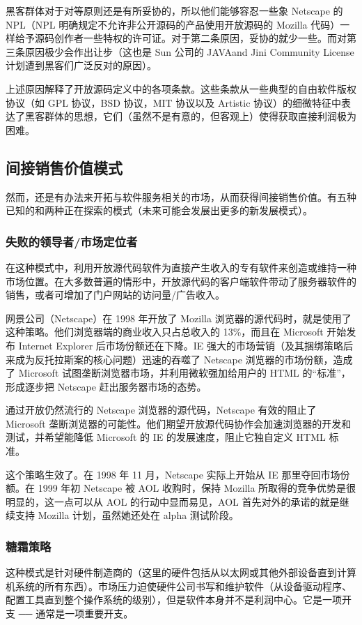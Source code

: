 黑客群体对于对等原则还是有所妥协的，所以他们能够容忍一些象 Netscape 的 NPL（NPL 明确规定不允许非公开源码的产品使用开放源码的 Mozilla 代码）一样给予源码创作者一些特权的许可证。对于第二条原因，妥协的就少一些。而对第三条原因极少会作出让步（这也是 Sun 公司的 JAVAand Jini Community License 计划遭到黑客们广泛反对的原因）。


上述原因解释了开放源码定义中的各项条款。这些条款从一些典型的自由软件版权协议（如 GPL 协议，BSD 协议，MIT 协议以及 Artistic 协议）的细微特征中表达了黑客群体的思想，它们（虽然不是有意的，但客观上）使得获取直接利润极为困难。

\subsection{间接销售价值模式}
然而，还是有办法来开拓与软件服务相关的市场，从而获得间接销售价值。有五种已知的和两种正在探索的模式（未来可能会发展出更多的新发展模式）。

\subsubsection{失败的领导者/市场定位者}
在这种模式中，利用开放源代码软件为直接产生收入的专有软件来创造或维持一种市场位置。在大多数普遍的情形中，开放源代码的客户端软件带动了服务器软件的销售，或者可增加了门户网站的访问量/广告收入。


网景公司（Netscape）在 1998 年开放了 Mozilla 浏览器的源代码时，就是使用了这种策略。他们浏览器端的商业收入只占总收入的 13\%，而且在 Microsoft 开始发布 Internet Explorer 后市场份额还在下降。IE 强大的市场营销（及其捆绑策略后来成为反托拉斯案的核心问题）迅速的吞噬了 Netscape 浏览器的市场份额，造成了 Microsoft 试图垄断浏览器市场，并利用微软强加给用户的 HTML 的“标准”，形成逐步把 Netscape 赶出服务器市场的态势。


通过开放仍然流行的 Netscape 浏览器的源代码，Netscape 有效的阻止了 Microsoft 垄断浏览器的可能性。他们期望开放源代码协作会加速浏览器的开发和测试，并希望能降低 Microsoft 的 IE 的发展速度，阻止它独自定义 HTML 标准。


这个策略生效了。在 1998 年 11 月，Netscape 实际上开始从 IE 那里夺回市场份额。在 1999 年初 Netscape 被 AOL 收购时，保持 Mozilla 所取得的竞争优势是很明显的，这一点可以从 AOL 的行动中显而易见，AOL 首先对外的承诺的就是继续支持 Mozilla 计划，虽然她还处在 alpha 测试阶段。

\subsubsection{糖霜策略}
这种模式是针对硬件制造商的（这里的硬件包括从以太网或其他外部设备直到计算机系统的所有东西）。市场压力迫使硬件公司书写和维护软件（从设备驱动程序、配置工具直到整个操作系统的级别），但是软件本身并不是利润中心。它是一项开支 ── 通常是一项重要开支。


